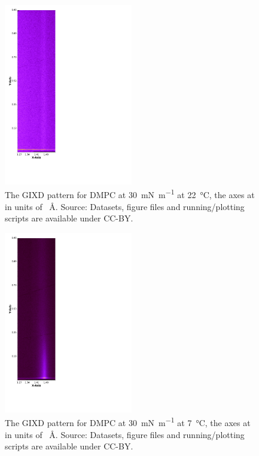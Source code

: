 \documentclass[11pt,a4paper]{paper}
\begin{document}
\begin{figure}[h]
	\centering
	\includegraphics[width=0.50\textwidth]{figures/206151}
	\caption{The GIXD pattern for DMPC at \SI{30}{\milli\newton\per\meter} at \SI{22}{\celsius}, the axes at in units of \si{\per\angstrom}. Source: Datasets, figure files and running/plotting scripts are available under CC-BY.\cite{mccluskey_2018}}
	\label{fig:dmpcgixd}
\end{figure}
\begin{figure}[h]
	\centering
	\includegraphics[width=0.50\textwidth]{figures/206161}
	\caption{The GIXD pattern for DMPC at \SI{30}{\milli\newton\per\meter} at \SI{7}{\celsius}, the axes at in units of \si{\per\angstrom}. Source: Datasets, figure files and running/plotting scripts are available under CC-BY.\cite{mccluskey_2018}}
	\label{fig:dmpcgixd7}
\end{figure}
\end{document}
